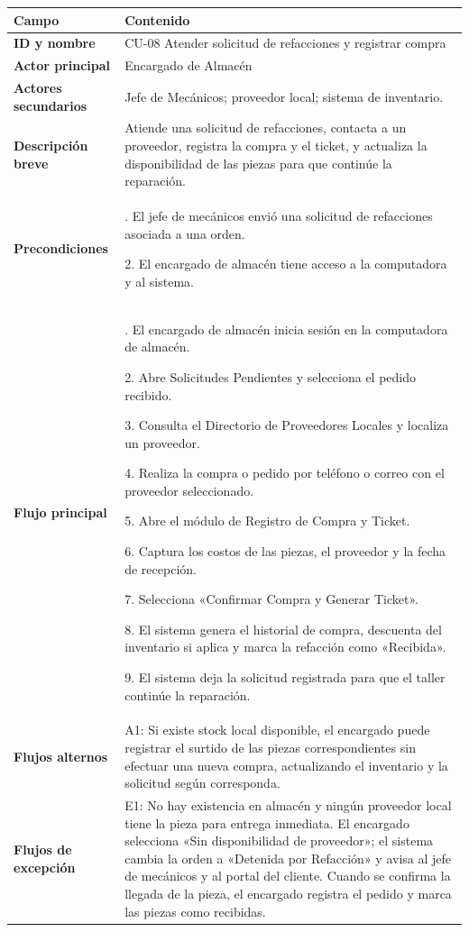{\def\LTcaptype{none} %
\begin{longtable}[]{@{}
  >{\raggedright\arraybackslash}p{}
  >{\raggedright\arraybackslash}p{}@{}}
\toprule\noalign{}
\begin{minipage}[b]{\linewidth}\raggedright
\textbf{Campo}
\end{minipage} & \begin{minipage}[b]{\linewidth}\raggedright
\textbf{Contenido}
\end{minipage} \\
\midrule\noalign{}
\endhead
\bottomrule\noalign{}
\endlastfoot
\textbf{ID y nombre} & CU-08 Atender solicitud de refacciones y
registrar compra \\
\textbf{Actor principal} & Encargado de Almacén \\
\textbf{Actores secundarios} & Jefe de Mecánicos; proveedor local;
sistema de inventario. \\
\textbf{Descripción breve} & Atiende una solicitud de refacciones,
contacta a un proveedor, registra la compra y el ticket, y actualiza la
disponibilidad de las piezas para que continúe la reparación. \\
\textbf{Precondiciones} & 1. El jefe de mecánicos envió una solicitud de
refacciones asociada a una orden.

2. El encargado de almacén tiene acceso a la computadora y al
sistema. \\
\textbf{Flujo principal} & 1. El encargado de almacén inicia sesión en
la computadora de almacén.

2. Abre Solicitudes Pendientes y selecciona el pedido recibido.

3. Consulta el Directorio de Proveedores Locales y localiza un
proveedor.

4. Realiza la compra o pedido por teléfono o correo con el proveedor
seleccionado.

5. Abre el módulo de Registro de Compra y Ticket.

6. Captura los costos de las piezas, el proveedor y la fecha de
recepción.

7. Selecciona «Confirmar Compra y Generar Ticket».

8. El sistema genera el historial de compra, descuenta del inventario si
aplica y marca la refacción como «Recibida».

9. El sistema deja la solicitud registrada para que el taller continúe
la reparación. \\
\textbf{Flujos alternos} & A1: Si existe stock local disponible, el
encargado puede registrar el surtido de las piezas correspondientes sin
efectuar una nueva compra, actualizando el inventario y la solicitud
según corresponda. \\
\textbf{Flujos de excepción} & E1: No hay existencia en almacén y ningún
proveedor local tiene la pieza para entrega inmediata. El encargado
selecciona «Sin disponibilidad de proveedor»; el sistema cambia la orden
a «Detenida por Refacción» y avisa al jefe de mecánicos y al portal del
cliente. Cuando se confirma la llegada de la pieza, el encargado
registra el pedido y marca las piezas como recibidas.


\end{longtable}}
